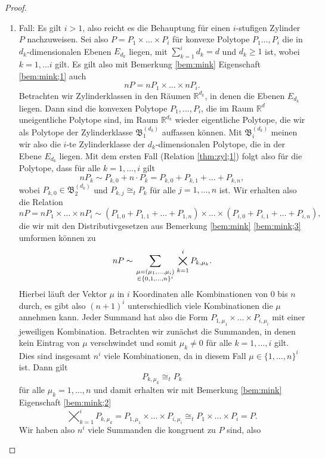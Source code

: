 \documentclass[11pt,titlepage]{article}
\newcommand{\setR}{\mathbb{R}}
\theoremstyle{definition}
\theoremstyle{remark}
\begin{document}
\begin{proof}
\begin{enumerate}
			\item Fall: Es gilt $i>1$, also reicht es die Behauptung für einen 
			$i$-stufigen Zylinder $P$ nachzuweisen. Sei also 
			$P=P_1\times\ldots \times P_i$ 
			für konvexe Polytope $P_1\ldots,P_i$ die in $d_k$-dimensionalen 
			Ebenen $E_{d_k}$ liegen, mit $\sum_{k=1}^i d_k =d$ und 
			$d_k\geq 1$ ist, wobei $k=1,\ldots i$ 
			gilt. Es gilt also mit Bemerkung \ref{bem:mink} Eigenschaft  
			\ref{bem:mink;1} auch 
			\[nP=nP_1\times\ldots\times nP_i.\]
			Betrachten wir Zylinderklassen in den Räumen $\setR^{d_k}$, in denen 
			die Ebenen $E_{d_k}$ liegen. Dann sind die konvexen Polytope 
			$P_1,\ldots,P_i$, die im Raum $\setR^d$ uneigentliche Polytope sind, 
			im Raum $\setR^{d_k}$ wieder eigentliche Polytope, die 
			wir als Polytope der Zylinderklasse $\mathfrak{B}_1^{(d_k)}$ 
			auffassen können. Mit $\mathfrak{B}_i^{(d_k)}$ meinen wir also 
			die $i$-te Zylinderklasse der $d_k$-dimensionalen Polytope, die in 
			der Ebene $E_{d_k}$ liegen. Mit dem ersten Fall (Relation 
			\ref{thm:zyl;1}) folgt also für 
			die Polytope, dass für alle $k=1,\ldots,i$ gilt
			\[nP_k\sim P_{k,0}+n\cdot P_k=P_{k,0}+P_{k,1}+\ldots+P_{k,n},\]
			wobei $P_{k,0}\in \mathfrak{B}_2^{(d_k)}$ und $P_{k,j}\cong_t P_k$ 
			für alle $j =1,\ldots,n$ ist. Wir erhalten also die Relation 
			\[nP=nP_1\times\ldots\times nP_i \sim (P_{1,0}+P_{1,1}+\ldots+P_{1,n})
			\times\ldots\times (P_{i,0}+P_{i,1}+\ldots+P_{i,n}),\]
			die wir mit den Distributivgesetzen aus Bemerkung 
			\ref{bem:mink} \ref{bem:mink;3} 
			umformen können zu
			\[nP\sim \sum_{\genfrac{}{}{0pt}{1}{\mu=(\mu_1,\ldots,\mu_i)}{\in \{0,1,\ldots,n\}^i}}
			\bigtimes_{k=1}^i P_{k,\mu_k}.\]
			Hierbei läuft der Vektor $\mu$ in $i$ Koordinaten alle 
			Kombinationen von $0$ bis $n$ durch, es gibt also $(n+1)^i$ 
			unterschiedlich viele Kombinationen die $\mu$ annehmen kann. 
			Jeder Summand hat also die Form 
			$P_{1,\mu_1}\times\ldots\times P_{i,\mu_i}$ mit einer jeweiligen 
			Kombination. 
			Betrachten wir zunächst die Summanden, in denen kein Eintrag 
			von $\mu$ verschwindet und somit $\mu_k\neq 0$ für alle 
			$k=1,\ldots,i$ gilt. Dies sind insgesamt $n^i$ viele Kombinationen, 
			da in diesem Fall $\mu\in\{1,\ldots,n\}^i$ ist. Dann gilt 
			\[P_{k,\mu_k}\cong_t P_k\]
			für alle $\mu_k=1,\ldots,n$ und damit erhalten wir mit 
			Bemerkung \ref{bem:mink} Eigenschaft \ref{bem:mink;2}
			\[\bigtimes_{k=1}^i P_{k,\mu_k}=
			P_{1,\mu_1}\times\ldots\times P_{i,\mu_i} \cong_t 
			P_1\times\ldots\times P_i =P.\]
			Wir haben also $n^i$ viele Summanden die kongruent zu $P$ sind, also 

\end{enumerate}
\end{proof}
\end{document}
